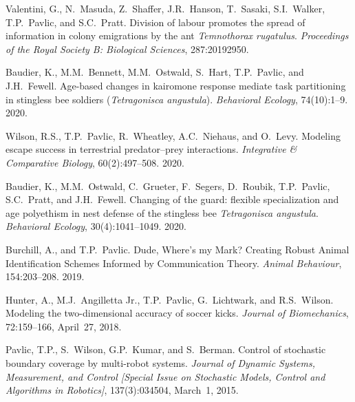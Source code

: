 \documentclass[10pt]{article}
\begin{document}
\begin{bibenum}
    \item Valentini, G., N.~Masuda, Z.~Shaffer, J.R.~Hanson, T.~Sasaki,
        S.I.~Walker, T.P.~Pavlic, and S.C.~Pratt.
        Division of labour promotes the spread of information in colony
        emigrations by the ant \emph{Temnothorax rugatulus}.
        \emph{Proceedings of the Royal Society B: Biological Sciences},
        287:20192950.

    \item Baudier, K., M.M.~Bennett, M.M.~Ostwald, S.~Hart, T.P.~Pavlic,
        and J.H.~Fewell. Age-based changes in kairomone response mediate
        task partitioning in stingless bee soldiers (\emph{Tetragonisca
        angustula}). \emph{Behavioral Ecology}, 74(10):1--9. 2020.

    \item Wilson, R.S., T.P.~Pavlic, R.~Wheatley, A.C.~Niehaus, and
        O.~Levy. Modeling escape success in terrestrial predator--prey
        interactions.
        \emph{Integrative \& Comparative Biology}, 60(2):497--508. 2020.

    \item Baudier, K., M.M.~Ostwald, C.~Grueter, F.~Segers, D.~Roubik,
        T.P.~Pavlic, S.C.~Pratt, and J.H.~Fewell. Changing of the guard:
        flexible specialization and age polyethism in nest defense of
        the stingless bee \emph{Tetragonisca angustula}.
        \emph{Behavioral Ecology}, 30(4):1041--1049. 2020.

    \item Burchill, A., and T.P.~Pavlic. Dude, Where's my Mark? Creating
        Robust Animal Identification Schemes Informed by Communication
        Theory. \emph{Animal Behaviour}, 154:203--208. 2019.

    \item Hunter, A., M.J.~Angilletta Jr., T.P.~Pavlic, G.~Lichtwark,
        and R.S.~Wilson. Modeling the two-dimensional accuracy of soccer
        kicks. \emph{Journal of Biomechanics}, 72:159--166, April~27,
        2018. 

    \item Pavlic, T.P., S.~Wilson, G.P.~Kumar, and S.~Berman. Control of
        stochastic boundary coverage by multi-robot systems.
        \emph{Journal of Dynamic Systems, Measurement, and Control
        [Special Issue on Stochastic Models, Control and Algorithms
        in Robotics]}, 137(3):034504, March~1, 2015.


\end{bibenum}
\end{document}
